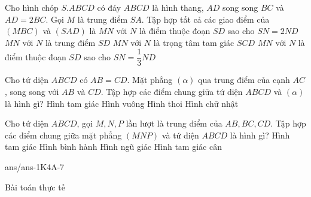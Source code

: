 \begin{ex}%
	Cho hình chóp $S.ABCD$ có đáy $ABCD$ là hình thang, $AD$ song song $BC$ và $AD=2BC$. Gọi $M$ là trung điểm $SA$. Tập hợp tất cả các giao điểm của $(MBC)$ và $(SAD)$ là
	\choice
	{$MN$ với $N$ là điểm thuộc đoạn $SD$ sao cho $SN=2ND$}
	{\True $MN$ với $N$ là trung điểm $SD$}
	{$MN$ với $N$ là trọng tâm tam giác $SCD$}
	{$MN$ với $N$ là điểm thuộc đoạn $SD$ sao cho $SN=\dfrac{1}{3}ND$}
\end{ex}
\begin{ex}%
	Cho tứ diện $ABCD$ có $AB=CD$. Mặt phẳng $( \alpha )$ qua trung điểm của cạnh $AC$, song song với $AB$ và $CD$. Tập hợp các điểm chung giữa tứ diện $ABCD$ và $(\alpha)$ là hình gì?
	\choice
	{ Hình tam giác}
	{ Hình vuông}
	{\True Hình thoi}
	{ Hình chữ nhật}
\end{ex}
\begin{ex}%
	Cho tứ diện $ABCD$, gọi $M,N,P$ lần lượt là trung điểm của $AB,BC,CD$. Tập hợp các điểm chung giữa mặt phẳng $(MNP)$ và tứ diện $ ABCD $ là hình gì?
	\choice
	{ Hình tam giác}
	{\True Hình bình hành}
	{ Hình ngũ giác}
	{ Hình tam giác cân}
\end{ex}

\begin{indapan}{10}
	{ans/ans-1K4A-7}
\end{indapan}

\begin{dang}{Bài toán thực tế}
	
\end{dang}

